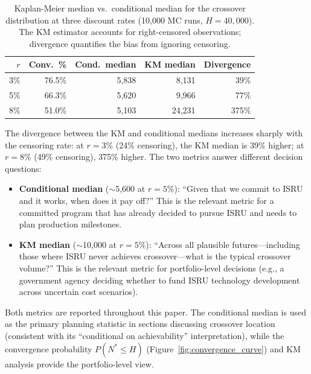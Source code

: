 \documentclass[preprint,12pt]{elsarticle}
\begin{document}
\begin{table}[htbp]
\centering
\caption{Kaplan-Meier median vs.\ conditional median for the crossover distribution at three discount rates (10{,}000 MC runs, $H = 40{,}000$). The KM estimator accounts for right-censored observations; divergence quantifies the bias from ignoring censoring.}
\label{tab:kaplan_meier}
\small
\begin{tabular}{@{}rrrrr@{}}
\toprule
$r$ & Conv.\ \% & Cond.\ median & KM median & Divergence \\
\midrule
3\%  & 76.5\% & 5{,}838 & 8{,}131  & 39\% \\
5\%  & 66.3\% & 5{,}620 & 9{,}966  & 77\% \\
8\%  & 51.0\% & 5{,}103 & 24{,}231 & 375\% \\
\bottomrule
\end{tabular}
\end{table}

The divergence between the KM and conditional medians increases sharply with the censoring rate: at $r = 3\%$ (24\% censoring), the KM median is 39\% higher; at $r = 8\%$ (49\% censoring), 375\% higher. The two metrics answer different decision questions:
\begin{itemize}
  \item \textbf{Conditional median} ($\sim$5{,}600 at $r = 5\%$): ``Given that we commit to ISRU and it works, when does it pay off?'' This is the relevant metric for a committed program that has already decided to pursue ISRU and needs to plan production milestones.
  \item \textbf{KM median} ($\sim$10{,}000 at $r = 5\%$): ``Across all plausible futures---including those where ISRU never achieves crossover---what is the typical crossover volume?'' This is the relevant metric for portfolio-level decisions (e.g., a government agency deciding whether to fund ISRU technology development across uncertain cost scenarios).
\end{itemize}
Both metrics are reported throughout this paper. The conditional median is used as the primary planning statistic in sections discussing crossover location (consistent with its ``conditional on achievability'' interpretation), while the convergence probability $P(N^* \leq H)$ (Figure~\ref{fig:convergence_curve}) and KM analysis provide the portfolio-level view.
\end{document}
